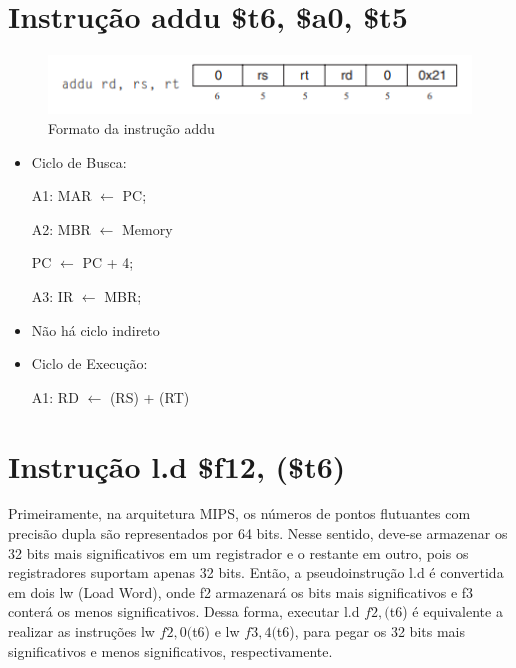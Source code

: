\documentclass[
	12pt,				%
	oneside,			%
	a4paper,			%
	english,			%
	brazil				%
	]{abntex2ppgsi}
\begin{document}
\section{Instrução addu \$t6, \$a0, \$t5}

\begin{figure}[h]
    \centering
    \includegraphics{47.png}
    \caption{Formato da instrução addu}
    \label{fig47}
\end{figure}

\begin{itemize}
    \item Ciclo de Busca:

    A1: MAR $\leftarrow$ PC;
    
    A2: MBR $\leftarrow$ Memory 
    
       PC $\leftarrow$ PC + 4;

    A3: IR $\leftarrow$ MBR;

    \item Não há ciclo indireto
    \item Ciclo de Execução:

    A1: RD $\leftarrow$ (RS) + (RT)
\end{itemize}

\section{Instrução l.d \$f12, (\$t6)}

Primeiramente, na arquitetura MIPS, os números de pontos flutuantes com precisão dupla são representados por 64 bits. Nesse sentido, deve-se armazenar os 32 bits mais significativos em um registrador e o restante em outro, pois os registradores suportam apenas 32 bits. Então, a pseudoinstrução l.d é convertida em dois lw (Load Word), onde f2 armazenará os bits mais significativos e f3 conterá os menos significativos. Dessa forma, executar l.d $f2, ($t6) é equivalente a realizar as instruções lw $f2, 0($t6) e lw $f3, 4($t6), para pegar os 32 bits mais significativos e menos significativos, respectivamente.
\end{document}
